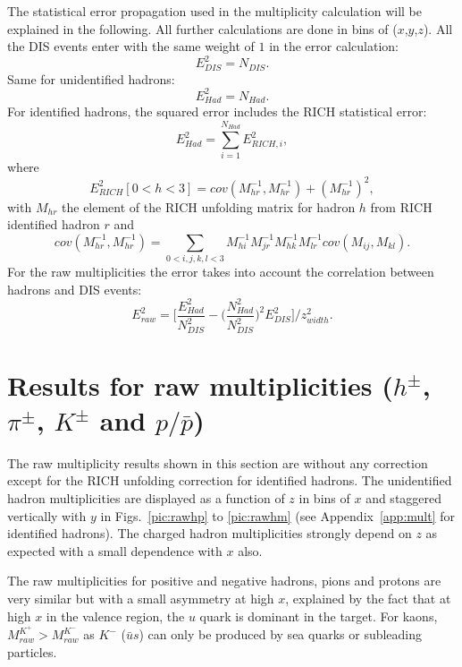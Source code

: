 The statistical error propagation used in the multiplicity calculation will be explained in the following. All further calculations are done in bins of ($x$,$y$,$z$). All the DIS events enter with the same weight of $1$ in the error calculation:
%
\begin{equation}
		E^2_{DIS} = N_{DIS}.
\end{equation}
%
Same for unidentified hadrons:
%
\begin{equation}
		E^2_{Had} = N_{Had}.
\end{equation}
%
For identified hadrons, the squared error includes the RICH statistical error:
%
\begin{equation}
		E^2_{Had} = \sum_{i=1}^{N_{Had}} E^2_{RICH,i},
\end{equation}
%
where
%
\begin{equation}
		E^2_{RICH}[0<h<3] = cov(M^{-1}_{hr},M^{-1}_{hr})+(M^{-1}_{hr})^2,
\end{equation}
%
with $M_{hr}$ the element of the RICH unfolding matrix for hadron $h$ from RICH identified hadron $r$ and
%
\begin{equation}
		cov(M^{-1}_{hr},M^{-1}_{hr}) = \sum_{0<i,j,k,l<3} M^{-1}_{hi}M^{-1}_{jr}M^{-1}_{hk}M^{-1}_{lr}cov(M_{ij},M_{kl}).
\end{equation}
%
For the raw multiplicities the error takes into account the correlation between hadrons and DIS events:
%
\begin{equation}
		E^2_{raw} = \Bigg[\frac{E^2_{Had}}{N^2_{DIS}} - \bigg( \frac{N^2_{Had}}{N^2_{DIS}} \bigg)^2 E^2_{DIS} \Bigg]/z^2_{width}.
\end{equation}
%
\section{Results for raw multiplicities ($h^{\pm}$, $\pi^{\pm}$, $K^{\pm}$ and $p/\bar{p}$)}

The raw multiplicity results shown in this section are without any correction except for the RICH unfolding correction for identified hadrons. The unidentified hadron multiplicities are displayed as a function of $z$ in bins of $x$ and staggered vertically with $y$ in Figs.~\ref{pic:rawhp} to \ref{pic:rawhm} (see Appendix~\ref{app:mult} for identified hadrons). The charged hadron multiplicities strongly depend on $z$ as expected with a small dependence with $x$ also.

The raw multiplicities for positive and negative hadrons, pions and protons are very similar but with a small asymmetry at high $x$, explained by the fact that at high $x$ in the valence region, the $u$ quark is dominant in the target. For kaons, $M_{raw}^{K^+} > M_{raw}^{K^-}$ as $K^-$ ($\bar{u}s$) can only be produced by sea quarks or subleading particles.

